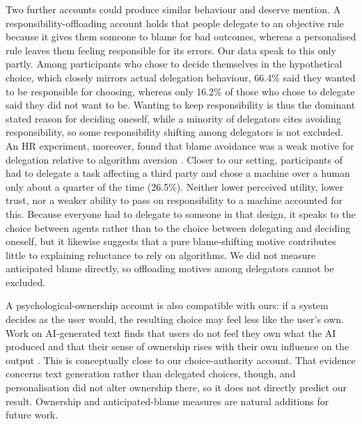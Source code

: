 \documentclass[a4paper, 12pt, fleqn]{article}
\theoremstyle{hypstyle}
\begin{document}
Two further accounts could produce similar behaviour and deserve mention. A responsibility-offloading account holds that people delegate to an objective rule because it gives them someone to blame for bad outcomes, whereas a personalised rule leaves them feeling responsible for its errors. Our data speak to this only partly. Among participants who chose to decide themselves in the hypothetical choice, which closely mirrors actual delegation behaviour, 66.4\% said they wanted to be responsible for choosing, whereas only 16.2\% of those who chose to delegate said they did not want to be. Wanting to keep responsibility is thus the dominant stated reason for deciding oneself, while a minority of delegators cites avoiding responsibility, so some responsibility shifting among delegators is not excluded. An HR experiment, moreover, found that blame avoidance was a weak motive for delegation relative to algorithm aversion \citep{Maasland2022}. Closer to our setting, participants of \citet{GogollUhl2018} had to delegate a task affecting a third party and chose a machine over a human only about a quarter of the time (26.5\%). Neither lower perceived utility, lower trust, nor a weaker ability to pass on responsibility to a machine accounted for this. Because everyone had to delegate to someone in that design, it speaks to the choice between agents rather than to the choice between delegating and deciding oneself, but it likewise suggests that a pure blame-shifting motive contributes little to explaining reluctance to rely on algorithms. We did not measure anticipated blame directly, so offloading motives among delegators cannot be excluded. 
	
A psychological-ownership account is also compatible with ours: if a system decides as the user would, the resulting choice may feel less like the user's own. Work on AI-generated text finds that users do not feel they own what the AI produced and that their sense of ownership rises with their own influence on the output \citep{Draxler2024}. This is conceptually close to our choice-authority account. That evidence concerns text generation rather than delegated choices, though, and personalisation did not alter ownership there, so it does not directly predict our result. Ownership and anticipated-blame measures are natural additions for future work.
\end{document}

